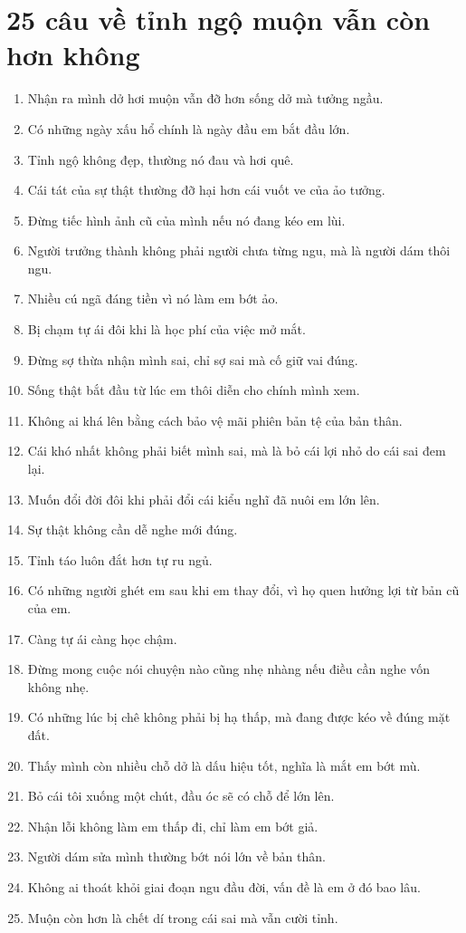 \section{25 câu về tỉnh ngộ muộn vẫn còn hơn không}
\begin{enumerate}[leftmargin=*,resume]
\item Nhận ra mình dở hơi muộn vẫn đỡ hơn sống dở mà tưởng ngầu.
\item Có những ngày xấu hổ chính là ngày đầu em bắt đầu lớn.
\item Tỉnh ngộ không đẹp, thường nó đau và hơi quê.
\item Cái tát của sự thật thường đỡ hại hơn cái vuốt ve của ảo tưởng.
\item Đừng tiếc hình ảnh cũ của mình nếu nó đang kéo em lùi.
\item Người trưởng thành không phải người chưa từng ngu, mà là người dám thôi ngu.
\item Nhiều cú ngã đáng tiền vì nó làm em bớt ảo.
\item Bị chạm tự ái đôi khi là học phí của việc mở mắt.
\item Đừng sợ thừa nhận mình sai, chỉ sợ sai mà cố giữ vai đúng.
\item Sống thật bắt đầu từ lúc em thôi diễn cho chính mình xem.
\item Không ai khá lên bằng cách bảo vệ mãi phiên bản tệ của bản thân.
\item Cái khó nhất không phải biết mình sai, mà là bỏ cái lợi nhỏ do cái sai đem lại.
\item Muốn đổi đời đôi khi phải đổi cái kiểu nghĩ đã nuôi em lớn lên.
\item Sự thật không cần dễ nghe mới đúng.
\item Tỉnh táo luôn đắt hơn tự ru ngủ.
\item Có những người ghét em sau khi em thay đổi, vì họ quen hưởng lợi từ bản cũ của em.
\item Càng tự ái càng học chậm.
\item Đừng mong cuộc nói chuyện nào cũng nhẹ nhàng nếu điều cần nghe vốn không nhẹ.
\item Có những lúc bị chê không phải bị hạ thấp, mà đang được kéo về đúng mặt đất.
\item Thấy mình còn nhiều chỗ dở là dấu hiệu tốt, nghĩa là mắt em bớt mù.
\item Bỏ cái tôi xuống một chút, đầu óc sẽ có chỗ để lớn lên.
\item Nhận lỗi không làm em thấp đi, chỉ làm em bớt giả.
\item Người dám sửa mình thường bớt nói lớn về bản thân.
\item Không ai thoát khỏi giai đoạn ngu đầu đời, vấn đề là em ở đó bao lâu.
\item Muộn còn hơn là chết dí trong cái sai mà vẫn cười tỉnh.
\end{enumerate}

